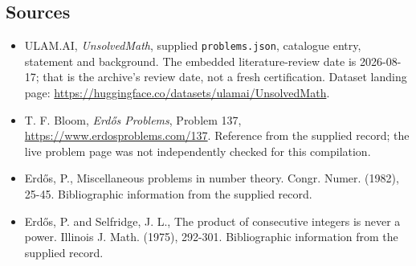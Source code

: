 \documentclass[11pt,a4paper]{article}
\begin{document}
\subsection{Sources}

{\small

\begin{itemize}

\item[\hypertarget{source:statement:1}{S1}] ULAM.AI, \emph{UnsolvedMath}, supplied \texttt{problems.json}, catalogue entry, statement and background. The embedded literature-review date is 2026-08-17; that is the archive’s review date, not a fresh certification. Dataset landing page: \url{https://huggingface.co/datasets/ulamai/UnsolvedMath}.

\item[\hypertarget{source:statement:2}{S2}] T. F. Bloom, \emph{Erdős Problems}, Problem 137, \url{https://www.erdosproblems.com/137}. Reference from the supplied record; the live problem page was not independently checked for this compilation.

\item[\hypertarget{source:statement:3}{S3}] Erd\H{o}s, P., Miscellaneous problems in number theory. Congr. Numer. (1982), 25-45. Bibliographic information from the supplied record.

\item[\hypertarget{source:statement:4}{S4}] Erd\H{o}s, P. and Selfridge, J. L., The product of consecutive integers is never a power. Illinois J. Math. (1975), 292-301. Bibliographic information from the supplied record.

\end{itemize}

}

\label{end:statement}
\end{document}
